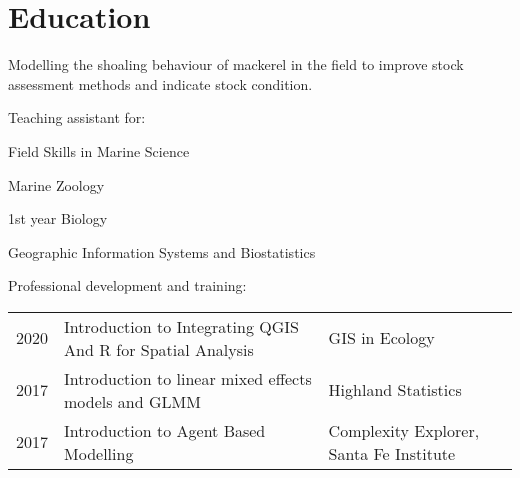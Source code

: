 \documentclass[a4paper]{deedy-resume} %
\begin{document}




\sectionspace
\section{Education} 

Modelling the shoaling behaviour of mackerel in the field to improve stock assessment
methods and indicate stock condition.

\sectionspace %

Teaching assistant for:
\begin{tightitemize}
\item Field Skills in Marine Science
\item Marine Zoology
\item 1st year Biology
\item Geographic Information Systems and Biostatistics
\end{tightitemize}

\sectionspace %

Professional development and training:
\begin{tabular}{ l l l }
2020 & Introduction to Integrating QGIS And R for Spatial Analysis & GIS in Ecology \\
2017 & Introduction to linear mixed effects models and GLMM & Highland Statistics \\
2017 & Introduction to Agent Based Modelling & Complexity Explorer, Santa Fe Institute
\end{tabular}
\end{document}
